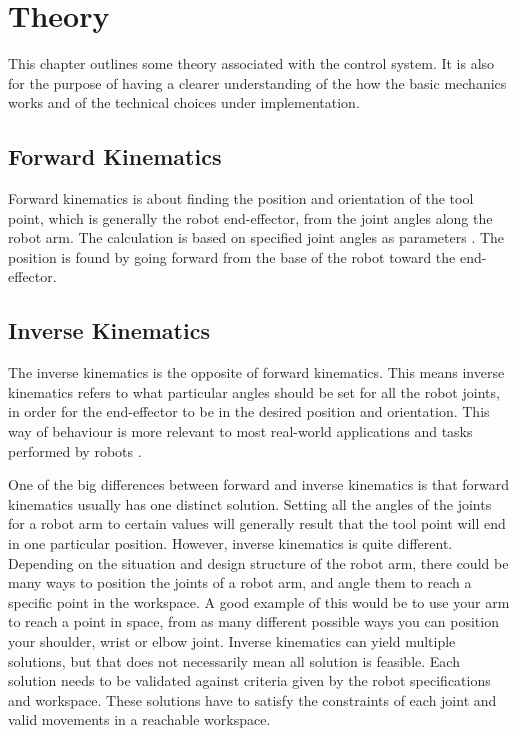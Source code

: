 \chapter{Theory}
\label{chap:theory}
This chapter outlines some theory associated with the control system. It is also for the purpose of having a clearer understanding of the how the basic mechanics works and of the technical choices under implementation. 

\section{Forward Kinematics}

Forward kinematics is about finding the position and orientation of the tool point, which is generally the robot end-effector, from the joint angles along the robot arm. The calculation is based on specified joint angles as parameters \cite{forward_kinematics}. The position is found by going forward from the base of the robot toward the end-effector. 

\section{Inverse Kinematics}

The inverse kinematics is the opposite of forward kinematics. This means inverse kinematics refers to what particular angles should be set for all the robot joints, in order for the end-effector to be in the desired position and orientation. This way of behaviour is more relevant to most real-world applications and tasks performed by robots \cite{inverse_kinematics}. 

One of the big differences between forward and inverse kinematics is that forward kinematics usually has one distinct solution. Setting all the angles of the joints for a robot arm to certain values will generally result that the tool point will end in one particular position. However, inverse kinematics is quite different. Depending on the situation and design structure of the robot arm, there could be many ways to position the joints of a robot arm, and angle them to reach a specific point in the workspace. A good example of this would be to use your arm to reach a point in space, from as many different possible ways you can position your shoulder, wrist or elbow joint. Inverse kinematics can yield multiple solutions, but that does not necessarily mean all solution is feasible. Each solution needs to be validated against criteria given by the robot specifications and workspace. These solutions have to satisfy the constraints of each joint and valid movements in a reachable workspace.


